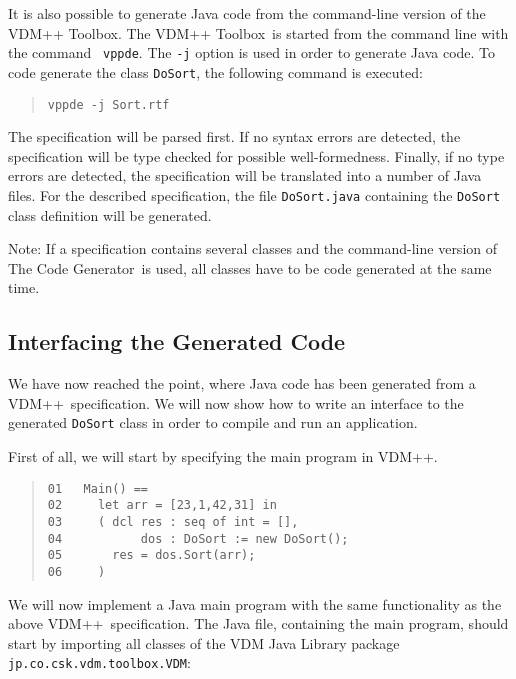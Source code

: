 \documentclass[\pformat,11pt]{article}
\newcommand{\ToolboxName}{VDM++ Toolbox}
\newcommand{\vdmde}{vppde}
\newcommand{\Tcg}{The Code Generator}
\newcommand{\VDM}{VDM++}
\newcommand{\JL}{VDM Java Library}
\begin{document}
It is also possible to generate Java code from the command-line
version of the \ToolboxName. The \ToolboxName\ is started from the
command line with the command {\tt
\vdmde}. The {\tt -j} option is used in order to
generate Java code. To code generate the class {\tt DoSort},
the following command is executed:

\begin{quote}
\begin{verbatim}
vppde -j Sort.rtf
\end{verbatim}
\end{quote}

The specification will be parsed first. If no syntax errors are
detected, the specification will be type checked for possible
well-formedness. Finally, if no type errors are detected, the
specification will be translated into a number of Java files.  For the
described specification, the file {\tt DoSort.java} containing the
{\tt DoSort} class definition will be generated.

Note: If a specification contains several classes and the command-line
version of \Tcg\ is used, all classes have to be code generated at the
same time.


\subsection{Interfacing the Generated Code}\label{interfacinggettingstarted}

We have now reached the point, where Java code has been generated from
a \VDM\ specification.  We will now show how to write an interface to
the generated {\tt DoSort} class in order to compile and run an
application.

\newpage
First of all, we will start by specifying the  main program in \VDM{}.

\begin{quote}
\begin{verbatim}
01   Main() ==
02     let arr = [23,1,42,31] in  
03     ( dcl res : seq of int = [],
04           dos : DoSort := new DoSort();
05       res = dos.Sort(arr);
06     )
\end{verbatim}
\end{quote}

We will now implement a Java main program with the same functionality
as the above \VDM\ specification. 
The Java file, containing the main program, should start by 
importing all classes of the \JL{} package {\tt jp.co.csk.vdm.toolbox.VDM}:
\end{document}
